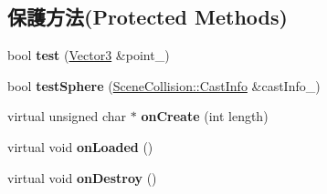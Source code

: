 \subsection*{保護方法(Protected Methods)}
\begin{DoxyCompactItemize}
\item 
bool {\bfseries test} (\hyperlink{class_i_dream_sky_1_1_vector3}{Vector3} \&point\+\_\+)\hypertarget{class_i_dream_sky_1_1_scene_collision_1_1_resource_aae76dc9a46306dc2ebcc7df6b523e2dd}{}\label{class_i_dream_sky_1_1_scene_collision_1_1_resource_aae76dc9a46306dc2ebcc7df6b523e2dd}

\item 
bool {\bfseries test\+Sphere} (\hyperlink{class_i_dream_sky_1_1_scene_collision_1_1_cast_info}{Scene\+Collision\+::\+Cast\+Info} \&cast\+Info\+\_\+)\hypertarget{class_i_dream_sky_1_1_scene_collision_1_1_resource_a09049984f9f5b6c17419c2dba0dd5da5}{}\label{class_i_dream_sky_1_1_scene_collision_1_1_resource_a09049984f9f5b6c17419c2dba0dd5da5}

\item 
virtual unsigned char $\ast$ {\bfseries on\+Create} (int length)\hypertarget{class_i_dream_sky_1_1_scene_collision_1_1_resource_a90459b7b2792c008582c7b8d15842111}{}\label{class_i_dream_sky_1_1_scene_collision_1_1_resource_a90459b7b2792c008582c7b8d15842111}

\item 
virtual void {\bfseries on\+Loaded} ()\hypertarget{class_i_dream_sky_1_1_scene_collision_1_1_resource_af01d75d3c8ed2ae8ff44f90fbdc9d631}{}\label{class_i_dream_sky_1_1_scene_collision_1_1_resource_af01d75d3c8ed2ae8ff44f90fbdc9d631}

\item 
virtual void {\bfseries on\+Destroy} ()\hypertarget{class_i_dream_sky_1_1_scene_collision_1_1_resource_a9ff4bc2efd41b687e89a90c509e4fb1b}{}\label{class_i_dream_sky_1_1_scene_collision_1_1_resource_a9ff4bc2efd41b687e89a90c509e4fb1b}

\end{DoxyCompactItemize}
